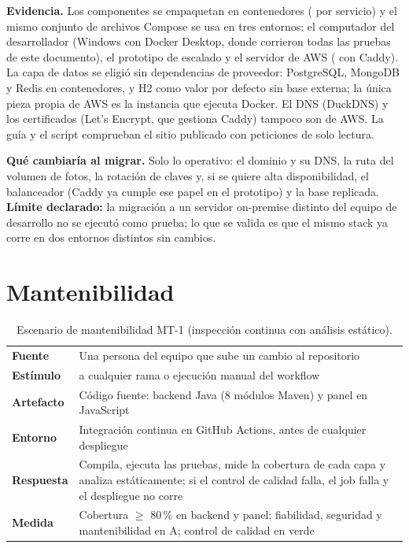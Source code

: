 \textbf{Evidencia.} Los componentes se empaquetan en contenedores ( por servicio) y el mismo conjunto de archivos Compose se
usa en tres entornos: el computador del desarrollador (Windows con Docker Desktop, donde corrieron todas las pruebas de este documento), el
prototipo de escalado y el servidor de AWS ( con Caddy). La capa de datos se eligió sin dependencias de
proveedor: PostgreSQL, MongoDB y Redis en contenedores, y H2 como valor por defecto sin base externa; la única pieza propia de AWS es la
instancia que ejecuta Docker. El DNS (DuckDNS) y los certificados (Let's Encrypt, que gestiona Caddy) tampoco son de AWS. La guía
 y el script  comprueban el sitio publicado con peticiones de solo lectura.

\textbf{Qué cambiaría al migrar.} Solo lo operativo: el dominio y su DNS, la ruta del volumen de fotos, la rotación de claves y, si se
quiere alta disponibilidad, el balanceador (Caddy ya cumple ese papel en el prototipo) y la base replicada. \textbf{Límite declarado:} la
migración a un servidor on-premise distinto del equipo de desarrollo no se ejecutó como prueba; lo que se valida es que el mismo stack ya corre
en dos entornos distintos sin cambios.

\section{Mantenibilidad}\label{sec:mantenibilidad}

\begin{table}[H]
\centering\small
\caption{Escenario de mantenibilidad MT-1 (inspección continua con análisis estático).}\label{tab:mt1}
\begin{tabularx}{\textwidth}{lY}
\toprule
\textbf{Fuente} & Una persona del equipo que sube un cambio al repositorio \\
\textbf{Estímulo} &  a cualquier rama o ejecución manual del workflow \\
\textbf{Artefacto} & Código fuente: backend Java (8 módulos Maven) y panel en JavaScript \\
\textbf{Entorno} & Integración continua en GitHub Actions, antes de cualquier despliegue \\
\textbf{Respuesta} & Compila, ejecuta las pruebas, mide la cobertura de cada capa y analiza estáticamente; si el control de calidad falla, el job falla y el despliegue no corre \\
\textbf{Medida} & Cobertura $\geq$ 80\,\% en backend y panel; fiabilidad, seguridad y mantenibilidad en A; control de calidad en verde \\
\bottomrule
\end{tabularx}
\end{table}

